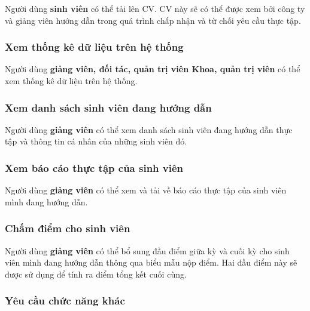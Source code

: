 \documentclass[./../main.tex]{subfiles}
\begin{document}
Người dùng \textbf{sinh viên} có thể tải lên CV. CV này sẽ có thể được
xem bởi công ty và giảng viên hướng dẫn trong quá trình chấp nhận và từ
chối yêu cầu thực tập.

\hypertarget{xem-thux1ed1ng-kuxea-dux1eef-liux1ec7u-truxean-hux1ec7-thux1ed1ng}{%
	\subsubsection{Xem thống kê dữ liệu trên hệ
		thống}\label{xem-thux1ed1ng-kuxea-dux1eef-liux1ec7u-truxean-hux1ec7-thux1ed1ng}}

Người dùng \textbf{giảng viên, đối tác, quản trị viên Khoa, quản trị
	viên} có thể xem thống kê dữ liệu trên hệ thống.

\hypertarget{xem-danh-suxe1ch-sinh-viuxean-ux111ang-hux1b0ux1edbng-dux1eabn}{%
	\subsubsection{Xem danh sách sinh viên đang hướng
		dẫn}\label{xem-danh-suxe1ch-sinh-viuxean-ux111ang-hux1b0ux1edbng-dux1eabn}}

Người dùng \textbf{giảng viên} có thể xem danh sách sinh viên đang hướng
dẫn thực tập và thông tin cá nhân của những sinh viên đó.

\hypertarget{xem-buxe1o-cuxe1o-thux1ef1c-tux1eadp-cux1ee7a-sinh-viuxean}{%
	\subsubsection{Xem báo cáo thực tập của sinh
		viên}\label{xem-buxe1o-cuxe1o-thux1ef1c-tux1eadp-cux1ee7a-sinh-viuxean}}

Người dùng \textbf{giảng viên} có thể xem và tải về báo cáo thực tập của
sinh viên mình đang hướng dẫn.

\hypertarget{chux1ea5m-ux111iux1ec3m-cho-sinh-viuxean}{%
	\subsubsection{Chấm điểm cho sinh
		viên}\label{chux1ea5m-ux111iux1ec3m-cho-sinh-viuxean}}

Người dùng \textbf{giảng viên} có thể bổ sung đầu điểm giữa kỳ và cuối
kỳ cho sinh viên mình đang hướng dẫn thông qua biểu mẫu nộp điểm. Hai
đầu điểm này sẽ được sử dụng để tính ra điểm tổng kết cuối cùng.

\subsubsection{Yêu cầu chức năng khác}
\end{document}
